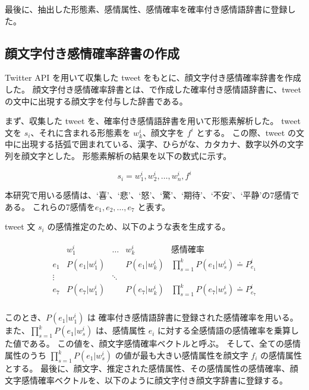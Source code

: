 \documentclass[11pt,a4j]{jsarticle}
\begin{document}
最後に、抽出した形態素、感情属性、感情確率を確率付き感情語辞書に登録した。

  \subsection{顔文字付き感情確率辞書の作成}\label{sec:kaomojidic}
Twitter API を用いて収集した tweet をもとに、顔文字付き感情確率辞書を作成した。
顔文字付き感情確率辞書とは、で作成した確率付き感情語辞書に、tweet の文中に出現する顔文字を付与した辞書である。

まず、収集した tweet を、確率付き感情語辞書を用いて形態素解析した。
tweet 文を $s_i$、それに含まれる形態素を $w^i_k$、顔文字を $f^i$ とする。
この際、tweet の文中に出現する括弧で囲まれている、漢字、ひらがな、カタカナ、数字以外の文字列を顔文字とした。
形態素解析の結果を以下の数式に示す。

\[
s_i=w^i_1,w^i_2,\ldots,w_n^i,f^i
\]

本研究で用いる感情は、`喜'、`悲'、`怒'、`驚'、`期待'、`不安'、`平静'の7感情である。
これらの7感情を$e_1, e_2, \ldots, e_7$ と表す。

tweet 文 $s_i$ の感情推定のため、以下のような表を生成する。

\begin{eqnarray*}
  \begin{array}{r|ccc|l}
        & w^i_1              & \ldots          & w^{i}_{k}    & 感情確率 \\ \hline
    e_1 & P(e_1|w^i_1) &                 & P(e_1|w^i_k) & \prod_{s=1}^{k}P(e_1|w^i_s) \doteq P^i_{e_1}\\
    \vdots             &                 & \ddots       &                                           & \\
    e_7 & P(e_7|w^i_1) &                 & P(e_7|w^i_k) & \prod_{s=1}^{k}P(e_7|w^i_s) \doteq P^i_{e_7}\\
  \end{array}
\end{eqnarray*}


このとき、$P(e_1|w^i_1)$ は 確率付き感情語辞書に登録された感情確率を用いる。
また、$\prod_{s=1}^{k}P(e_1|w^i_s)$ は、感情属性 $e_i$ に対する全感情語の感情確率を乗算した値である。
この値を、顔文字感情確率ベクトルと呼ぶ。
そして、全ての感情属性のうち $\prod_{s=1}^{k}P(e_1|w^i_s)$ の値が最も大きい感情属性を顔文字 $f_i$ の感情属性とする。
最後に、顔文字、推定された感情属性、その感情属性の感情確率、顔文字感情確率ベクトルを、以下のように顔文字付き顔文字辞書に登録する。
\end{document}

